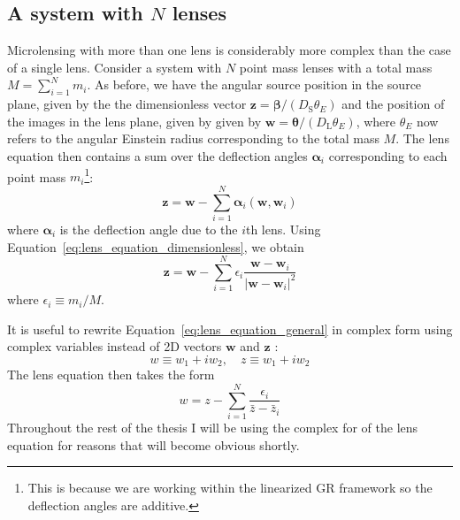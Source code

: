 \documentclass[12pt,dvipsnames]{report}
\renewcommand{\vec}[1]{\boldsymbol{\mathbf{#1}}}
\begin{document}
\subsection{A system with $N$ lenses}
\label{ssec:N_lenses}
Microlensing with more than one lens is considerably more complex than the case
of a single lens. Consider a system with $N$ point mass lenses with a total
mass $M=\sum_{i=1}^Nm_i$. As before, we have the angular source position in the
source plane, given by the the dimensionless vector
$\mathbf{z}=\boldsymbol\beta/(D_\textrm{S}\theta_E)$ and the position of the
images in the lens plane, given by given by
$\mathbf{w}=\boldsymbol\theta/(D_\textrm{L}\theta_E)$, where $\theta_E$ now
refers to the angular Einstein radius corresponding to the total mass $M$. The
lens equation then contains a sum over the deflection angles
$\boldsymbol\alpha_i$ corresponding to each point mass $m_i$\footnote{This is
    because we are working within the linearized GR framework so the deflection
    angles are additive.}:
\begin{equation}
    \mathbf{z}=\mathbf{w}-\sum_{i=1}^N\boldsymbol\alpha_i(\mathbf{w},\mathbf{w}_i)
\end{equation}
where $\boldsymbol\alpha_i$ is the deflection angle due to the $i$th lens.
Using Equation~\ref{eq:lens_equation_dimensionless}, we obtain
\begin{equation}
    \mathbf{z}=\mathbf{w}-\sum_{i=1}^N\epsilon_i\frac{\mathbf{w}-\mathbf{w}_i}
    {\lvert \mathbf{w}-\mathbf{w}_i\rvert^2}
    \label{eq:lens_equation_general}
\end{equation}
where $\epsilon_i\equiv m_i/M$.

It is useful to rewrite Equation~\ref{eq:lens_equation_general} in complex form
using complex variables instead of 2D vectors $\vec w$ and $\vec z$
\citep{1990A&A...236..311W}:
\begin{equation}
    w\equiv w_1+iw_2,\quad z\equiv w_1+iw_2
\end{equation}
The lens equation then takes the form
\begin{equation}
    w=z-\sum_{i=1}^N \frac{\epsilon_i}{\bar z-\bar z_i}
    \label{eq:lens_equation_complex}
\end{equation}
Throughout the rest of the thesis I will be using the complex  for of the lens
equation  for reasons that will become obvious shortly.
\end{document}

